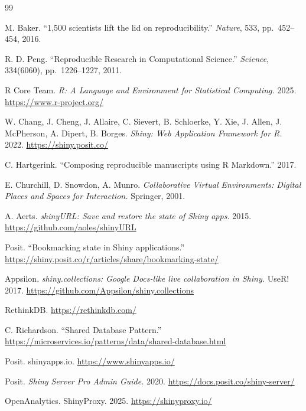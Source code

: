 \documentclass[12pt,a4paper]{article}
\begin{document}
\begin{thebibliography}{99}

 M. Baker. ``1,500 scientists lift the lid on reproducibility.'' \textit{Nature}, 533, pp.\ 452--454, 2016.

 R. D. Peng. ``Reproducible Research in Computational Science.'' \textit{Science}, 334(6060), pp.\ 1226--1227, 2011.

 R Core Team. \textit{R: A Language and Environment for Statistical Computing.} 2025. \url{https://www.r-project.org/}

 W. Chang, J. Cheng, J. Allaire, C. Sievert, B. Schloerke, Y. Xie, J. Allen, J. McPherson, A. Dipert, B. Borges. \textit{Shiny: Web Application Framework for R.} 2022. \url{https://shiny.posit.co/}

 C. Hartgerink. ``Composing reproducible manuscripts using R Markdown.'' 2017.

 E. Churchill, D. Snowdon, A. Munro. \textit{Collaborative Virtual Environments: Digital Places and Spaces for Interaction.} Springer, 2001.

 A. Aerts. \textit{shinyURL: Save and restore the state of Shiny apps.} 2015. \url{https://github.com/aoles/shinyURL}

 Posit. ``Bookmarking state in Shiny applications.'' \url{https://shiny.posit.co/r/articles/share/bookmarking-state/}

 Appsilon. \textit{shiny.collections: Google Docs-like live collaboration in Shiny.} UseR! 2017. \url{https://github.com/Appsilon/shiny.collections}

 RethinkDB. \url{https://rethinkdb.com/}

 C. Richardson. ``Shared Database Pattern.'' \url{https://microservices.io/patterns/data/shared-database.html}

 Posit. shinyapps.io. \url{https://www.shinyapps.io/}

 Posit. \textit{Shiny Server Pro Admin Guide.} 2020. \url{https://docs.posit.co/shiny-server/}

 OpenAnalytics. ShinyProxy. 2025. \url{https://shinyproxy.io/}


\end{thebibliography}
\end{document}
